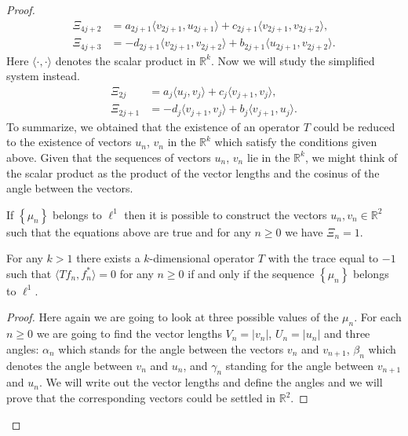 \begin{proof}
\begin{align*}
        \Xi_{4j + 2} &= a_{2j+1} \langle v_{2j+1}, u_{2j+1} \rangle + c_{2j+1} \langle v_{2j+1}, v_{2j+2} \rangle,\\
        \Xi_{4j + 3} &= -d_{2j+1} \langle v_{2j+1}, v_{2j+2}\rangle + b_{2j+1} \langle u_{2j+1}, v_{2j+2} \rangle.
      \end{align*}
      Here $\langle\cdot, \cdot\rangle$ denotes the scalar product in $\mathbb{R}^k$.
      Now we will study the simplified system instead.
      \begin{align*}
        \Xi_{2j} &= a_{j} \langle u_{j}, v_{j} \rangle  + c_{j} \langle v_{j+1}, v_{j} \rangle,\\
        \Xi_{2j + 1} &= -d_{j} \langle v_{j+1}, v_{j} \rangle + b_{j} \langle v_{j+1}, u_{j}\rangle.
      \end{align*}
      To summarize, we obtained that the existence of an operator $T$ could be reduced to the existence of vectors $u_n$, $v_n$ in the $\mathbb{R}^k$
        which satisfy the conditions given above.
      Given that the sequences of vectors $u_n$, $v_n$ lie in the $\mathbb{R}^k$, we might think of the scalar product as
        the product of the vector lengths and the cosinus of the angle between the vectors.
      \begin{prop}
        \label{k-dim-statement}
        If $\left\{\mu_n\right\}$ belongs to $\ell^1$ then it is possible to construct the vectors $u_n, v_n \in \mathbb{R}^2$ such that
          the equations above are true and for any $n \geq 0$ we have $\Xi_n = 1$.
      \end{prop}
      \begin{corol*}
        For any $k > 1$ there exists a $k$-dimensional operator $T$ with the trace equal to $-1$ such that $\langle Tf_n, f_n^*\rangle = 0$ for any $n \geq 0$
          if and only if the sequence $\left\{\mu_n\right\}$ belongs to $\ell^1$.
      \end{corol*}
      \begin{proof}
        Here again we are going to look at three possible values of the $\mu_n$.
        For each $n \geq 0$ we are going to find the vector lengths $V_n = |v_n|$, $U_n = |u_n|$ and three angles:
          $\alpha_n$ which stands for the angle between the vectors $v_n$ and $v_{n + 1}$,
          $\beta_n$ which denotes the angle between $v_n$ and $u_n$,
          and $\gamma_n$ standing for the angle between $v_{n + 1}$ and $u_n$.
        We will write out the vector lengths and define the angles and we will prove that the corresponding vectors could be settled in $\mathbb{R}^2$.


\end{proof}
\end{proof}
